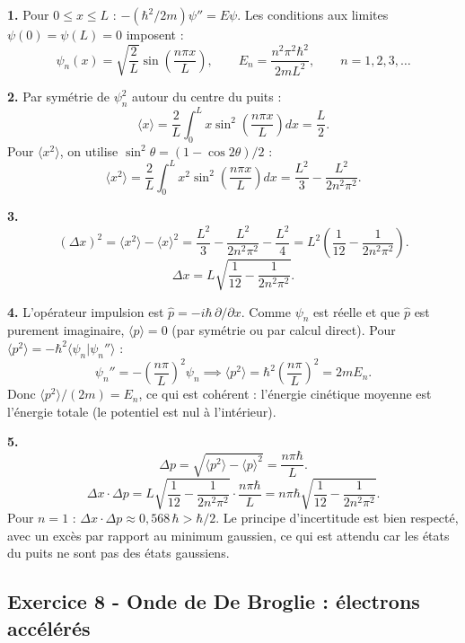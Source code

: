 \documentclass[12pt,a4paper]{article}
\begin{document}
\begin{boitecorrige}
\textbf{1.} Pour $0\leq x\leq L$ : $-(\hbar^2/2m)\psi'' = E\psi$. Les conditions aux limites
$\psi(0)=\psi(L)=0$ imposent :
\[
  \psi_n(x) = \sqrt{\frac{2}{L}}\sin\!\left(\frac{n\pi x}{L}\right), \qquad
  E_n = \frac{n^2\pi^2\hbar^2}{2mL^2}, \qquad n = 1, 2, 3, \ldots
\]

\textbf{2.} Par symétrie de $\psi_n^2$ autour du centre du puits :
\[
  \langle x\rangle = \frac{2}{L}\int_0^L x\sin^2\!\left(\frac{n\pi x}{L}\right)dx = \frac{L}{2}.
\]
Pour $\langle x^2\rangle$, on utilise $\sin^2\theta = (1-\cos 2\theta)/2$ :
\[
  \langle x^2\rangle = \frac{2}{L}\int_0^L x^2\sin^2\!\left(\frac{n\pi x}{L}\right)dx
  = \frac{L^2}{3} - \frac{L^2}{2n^2\pi^2}.
\]

\textbf{3.}
\[
  (\Delta x)^2 = \langle x^2\rangle - \langle x\rangle^2
               = \frac{L^2}{3} - \frac{L^2}{2n^2\pi^2} - \frac{L^2}{4}
               = L^2\!\left(\frac{1}{12} - \frac{1}{2n^2\pi^2}\right).
\]
\[
  \boxed{\Delta x = L\sqrt{\frac{1}{12}-\frac{1}{2n^2\pi^2}}.}
\]

\textbf{4.} L'opérateur impulsion est $\hat{p} = -i\hbar\,\partial/\partial x$. Comme $\psi_n$ est
réelle et que $\hat{p}$ est purement imaginaire, $\langle p\rangle = 0$ (par symétrie ou par calcul
direct). Pour $\langle p^2\rangle = -\hbar^2\langle\psi_n|\psi_n''\rangle$ :
\[
  \psi_n'' = -\left(\frac{n\pi}{L}\right)^2\psi_n
  \implies \langle p^2\rangle = \hbar^2\left(\frac{n\pi}{L}\right)^2 = 2mE_n.
\]
Donc $\langle p^2\rangle/(2m) = E_n$, ce qui est cohérent : l'énergie cinétique moyenne est
l'énergie totale (le potentiel est nul à l'intérieur).

\textbf{5.}
\[
  \Delta p = \sqrt{\langle p^2\rangle - \langle p\rangle^2} = \frac{n\pi\hbar}{L}.
\]
\[
  \Delta x\cdot\Delta p = L\sqrt{\frac{1}{12}-\frac{1}{2n^2\pi^2}}\cdot\frac{n\pi\hbar}{L}
  = n\pi\hbar\sqrt{\frac{1}{12}-\frac{1}{2n^2\pi^2}}.
\]
Pour $n=1$ : $\Delta x\cdot\Delta p \approx 0{,}568\,\hbar > \hbar/2$. Le principe d'incertitude
est bien respecté, avec un excès par rapport au minimum gaussien, ce qui est attendu car les états
du puits ne sont pas des états gaussiens.
\end{boitecorrige}

\subsection*{Exercice 8 - Onde de De Broglie : électrons accélérés \niveau{\facile}}
\end{document}
